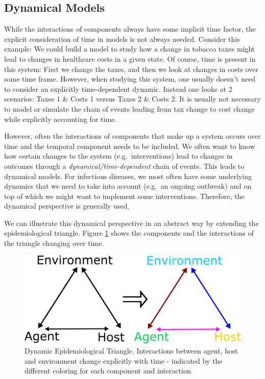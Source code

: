 \documentclass[]{book}
\theoremstyle{definition}
\theoremstyle{definition}
\theoremstyle{definition}
\theoremstyle{remark}
\begin{document}
\subsection{Dynamical Models}\label{dynamical-models}

While the interactions of components always have some implicit time
factor, the explicit consideration of time in models is not always
needed. Consider this example: We could build a model to study how a
change in tobacco taxes might lead to changes in healthcare costs in a
given state. Of course, time is present in this system: First we change
the taxes, and then we look at changes in costs over some time frame.
However, when studying this system, one usually doesn't need to consider
an explicitly time-dependent dynamic. Instead one looks at 2 scenarios:
Taxes 1 \& Costs 1 versus Taxes 2 \& Costs 2. It is usually not
necessary to model or simulate the chain of events leading from tax
change to cost change while explicitly accounting for time.

However, often the interactions of components that make up a system
occurs over time and the temporal component needs to be included. We
often want to know how certain changes to the system
(e.g.~interventions) lead to changes in outcomes through a
\emph{dynamical/time-dependent} chain of events. This leads to dynamical
models. For infectious diseases, we most often have some underlying
dynamics that we need to take into account (e.g.~an ongoing outbreak)
and on top of which we might want to implement some interventions.
Therefore, the dynamical perspective is generally used.

We can illustrate this dynamical perspective in an abstract way by
extending the epidemiological triangle. Figure \ref{fig:dynamictriangle}
shows the components and the interactions of the triangle changing over
time.

\begin{figure}
\centering
\includegraphics{./images/moving-triangle.png}
\caption{\label{fig:dynamictriangle}Dynamic Epidemiological Triangle.
Interactions between agent, host and environment change explicitly with
time - indicated by the different coloring for each component and
interaction.}
\end{figure}
\end{document}
